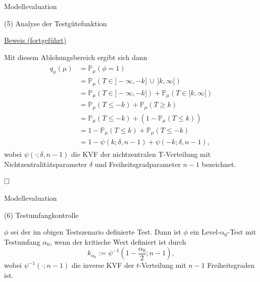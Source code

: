 \documentclass[
  8pt,
  ignorenonframetext,
]{beamer}
\begin{document}
\begin{frame}{Modellevaluation}
\protect\hypertarget{modellevaluation-10}{}

\noindent (5) Analyse der Testgütefunktion

\footnotesize

\underline{Beweis (fortgeführt)}

Mit diesem Ablehungsbereich ergibt sich dann \begin{align}
\begin{split}
q_\phi(\mu)
& = \mathbb{P}_{\mu}(\phi = 1)                                                   \\
& = \mathbb{P}_{\mu}\left(T \in ]-\infty, -k]\,
                         \cup \,]k,\infty[ \right)                               \\
& = \mathbb{P}_{\mu}\left(T \in ]-\infty, -k]\right)
  + \mathbb{P}_{\mu}\left(T \in [k,\infty[ \right)                               \\
& = \mathbb{P}_{\mu}(T \le -k)  + \mathbb{P}_{\mu}(T \ge k)                      \\
& = \mathbb{P}_{\mu}(T \le -k)  + (1-\mathbb{P}_{\mu}(T \le k))                  \\
& = 1 - \mathbb{P}_{\mu}(T \le k)  + \mathbb{P}_{\mu}(T \le - k)                 \\
& = 1 - \psi(k; \delta, n-1)  + \psi(-k;\delta,n-1),
\end{split}
\end{align} wobei \(\psi(\cdot; \delta,n-1)\) die KVF der nichtzentralen
T-Verteilung mit Nichtzentralitätsparameter \(\delta\) und
Freiheitsgradparameter \(n-1\) bezeichnet.

\(\hfill\Box\) \vfill
\end{frame}

\begin{frame}{Modellevaluation}
\protect\hypertarget{modellevaluation-11}{}

\noindent (6) Testumfangkontrolle \vfill \small

\begin{theorem}[Testumfangkontrolle]
\justifying
\normalfont
$\phi$ sei der im obigen Testszenario definierte Test. Dann ist $\phi$ ein
Level-$\alpha_0$-Test mit Testumfang $\alpha_0$, wenn der kritische Wert
definiert ist durch
\begin{equation}
k_{\alpha_0} := \psi^{-1}\left(1 - \frac{\alpha_0}{2}; n-1 \right),
\end{equation}
wobei $\psi^{-1}(\cdot; n-1)$ die inverse KVF der $t$-Verteilung mit $n-1$
Freiheitsgraden ist.
\end{theorem}
\vfill
\end{frame}
\end{document}
